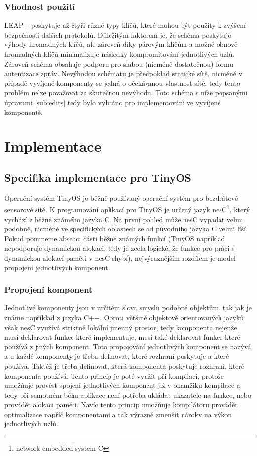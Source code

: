 \documentclass[11pt,final,twoside]{fithesis2}
\begin{document}
\subsection{Vhodnost použití}
LEAP+ poskytuje až čtyři různé typy klíčů, které mohou být použity k zvýšení bezpečnosti dalších protokolů. Důležitým faktorem je, že schéma poskytuje výhody hromadných klíčů, ale zároveň díky 
párovým klíčům a možné obnově hromadných klíčů minimalizuje následky kompromitování jednotlivých uzlů. Zároveň schéma obsahuje podporu pro slabou (nicméně dostatečnou) formu autentizace zpráv. 
Nevýhodou schématu je předpoklad statické sítě, nicméně v případě vyvíjené komponenty se jedná o očekávanou vlastnost sítě, tedy tento problém nelze považovat za skutečnou nevýhodu. Toto 
schéma s níže popsanými úpravami \ref{sub:edits} tedy bylo vybráno pro implementování ve vyvíjené komponentě.

\chapter{Implementace}

\section{Specifika implementace pro TinyOS}

Operační systém TinyOS je běžně používaný operační systém pro bezdrátové sensorové sítě. K programování aplikací pro TinyOS je určený jazyk nesC\footnote{network embedded system C}, který vychází z běžně 
známého jazyka C. Na první pohled může nesC vypadat velmi podobně, nicméně ve specifických oblastech se od původního jazyka C velmi liší. Pokud pomineme absenci části běžně známých funkcí (TinyOS například 
nepodporuje dynamickou alokaci, tedy je zcela logické, že funkce pro práci s dynamickou alokací paměti v nesC chybí), nejvýraznějším rozdílem je model propojení jednotlivých komponent.

\subsection{Propojení  komponent}
Jednotlivé komponenty jsou v určitém slova smyslu podobné objektům, tak jak je známe například z jazyka C++. Oproti většině objektově orientovaných jazyků však nesC využívá striktně lokální jmenný prostor, 
tedy komponenta nejenže musí deklarovat funkce které implementuje, musí také deklarovat funkce které používá z jiných komponent. \cite{Levis2009} Toto propojování jednotlivých komponent se nazývá  
a u každé komponenty je třeba definovat, které rozhraní poskytuje a které používá. Taktéž je třeba definovat, která komponenta poskytuje rozhraní, které komponenta používá. Tento princip je poté využit při 
kompilaci, protože umožňuje provést spojení jednotlivých komponent již v okamžiku kompilace a tedy při samotném běhu aplikace není potřeba ukládat ukazatele na funkce, nebo provádět alokaci paměti. Navíc
tento princip umožňuje kompilátoru provádět optimalizace napříč komponentami a tak výrazně zmenšit nároky na výkon jednotlivých uzlů.
\end{document}
